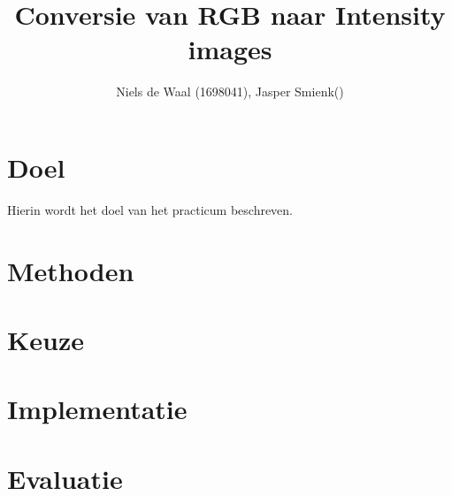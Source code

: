 \documentclass{report}
\begin{document}
\title{Conversie van RGB naar Intensity images}
\author{Niels de Waal (1698041), Jasper Smienk()}
\maketitle
\newpage

\tableofcontents
\newpage

\section{Doel}
Hierin wordt het doel van het practicum beschreven.

\section{Methoden}

\section{Keuze}

\section{Implementatie}

\section{Evaluatie}
\end{document}
